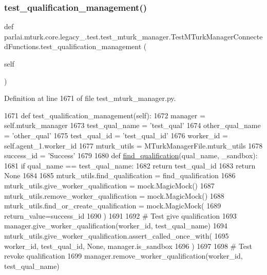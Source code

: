 \subsubsection{\texorpdfstring{test\+\_\+qualification\+\_\+management()}{test\_qualification\_management()}}
{\footnotesize\ttfamily def parlai.\+mturk.\+core.\+legacy\+\_.\+test.\+test\+\_\+mturk\+\_\+manager.\+Test\+M\+Turk\+Manager\+Connected\+Functions.\+test\+\_\+qualification\+\_\+management (\begin{DoxyParamCaption}\item[{}]{self }\end{DoxyParamCaption})}



Definition at line 1671 of file test\+\_\+mturk\+\_\+manager.\+py.


\begin{DoxyCode}
1671     \textcolor{keyword}{def }test\_qualification\_management(self):
1672         manager = self.mturk\_manager
1673         test\_qual\_name = \textcolor{stringliteral}{'test\_qual'}
1674         other\_qual\_name = \textcolor{stringliteral}{'other\_qual'}
1675         test\_qual\_id = \textcolor{stringliteral}{'test\_qual\_id'}
1676         worker\_id = self.agent\_1.worker\_id
1677         mturk\_utils = MTurkManagerFile.mturk\_utils
1678         success\_id = \textcolor{stringliteral}{'Success'}
1679 
1680         \textcolor{keyword}{def }\hyperlink{namespaceparlai_1_1mturk_1_1core_1_1dev_1_1mturk__utils_acd636315cbbf11cc5d9d641173e51586}{find\_qualification}(qual\_name, \_sandbox):
1681             \textcolor{keywordflow}{if} qual\_name == test\_qual\_name:
1682                 \textcolor{keywordflow}{return} test\_qual\_id
1683             \textcolor{keywordflow}{return} \textcolor{keywordtype}{None}
1684 
1685         mturk\_utils.find\_qualification = find\_qualification
1686         mturk\_utils.give\_worker\_qualification = mock.MagicMock()
1687         mturk\_utils.remove\_worker\_qualification = mock.MagicMock()
1688         mturk\_utils.find\_or\_create\_qualification = mock.MagicMock(
1689             return\_value=success\_id
1690         )
1691 
1692         \textcolor{comment}{# Test give qualification}
1693         manager.give\_worker\_qualification(worker\_id, test\_qual\_name)
1694         mturk\_utils.give\_worker\_qualification.assert\_called\_once\_with(
1695             worker\_id, test\_qual\_id, \textcolor{keywordtype}{None}, manager.is\_sandbox
1696         )
1697 
1698         \textcolor{comment}{# Test revoke qualification}
1699         manager.remove\_worker\_qualification(worker\_id, test\_qual\_name)

\end{DoxyCode}
